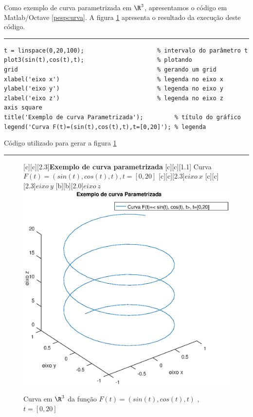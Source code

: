 Como exemplo de curva parametrizada em $\R^3$, apresentamos o código em Matlab/Octave \ref{pespcurva}. A figura \ref{fig.pespcurva} apresenta o resultado da execução deste código.

\begin{Codigo}[htpb]
\noindent\rule{13cm}{1.pt}
\begin{verbatim}
t = linspace(0,20,100);                     % intervalo do parâmetro t
plot3(sin(t),cos(t),t);                     % plotando 
grid                                        % gerando um grid
xlabel('eixo x')                            % legenda no eixo x
ylabel('eixo y')                            % legenda no eixo y
zlabel('eixo z')                            % legenda no eixo z
axis square
title('Exemplo de curva Parametrizada');         % título do gráfico 
legend('Curva F(t)=(sin(t),cos(t),t),t=[0,20]'); % legenda
\end{verbatim}
\vspace{-0.5cm}
\caption{Código utilizado para gerar a figura \ref{fig.pespcurva} } 
\noindent\rule{13cm}{1.pt}
\label{pespcurva}
\end{Codigo}

\begin{figure}[htpb]
\begin{center}
[c][c][2.3]{\textbf{Exemplo de curva parametrizada}}
[c][c][1.1]{\hspace{0.85cm} Curva $F(t)=(sin(t),cos(t),t), t=[0,20]$}
[c][c][2.3]{$eixo \ x$}
[c][c][2.3]{$eixo \ y$}
[b][b][2.0]{$eixo \ z$}
\includegraphics*[angle=0,scale=0.5]{imagens/cap2/pespcurva.eps} 
\caption{Curva em $\R^3$ da função $F(t)= (sin(t), cos(t), t)$ , $t=[0,20]$ } 
\label{fig.pespcurva}
\end{center}
\end{figure}


